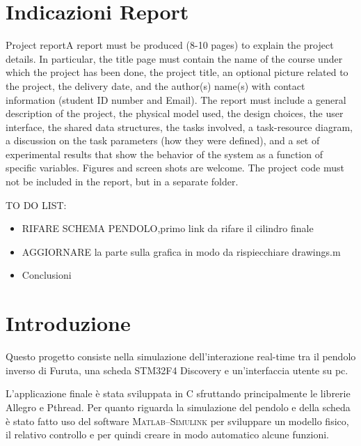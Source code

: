
\graphicspath{{./figs/}}

\title{}
\author{Francesco Petracci e Simone Silenzi} 






\section{Indicazioni Report}
Project reportA  report  must  be  produced  (8-10  pages)  to  explain  the  project  details.  In  particular,  the  title  page  must  contain  the  name  of  the  course  under  which  the  project  has  been  done,  the  project  title,  an  optional  picture related  to  the  project,  the  delivery  date,  and the  author(s)  name(s)  with  contact  information (student ID number and Email). The  report  must  include  a  general  description  of  the  project,  the  physical  model  used,  the  design  choices, the user interface, the shared data structures, the tasks involved, a task-resource diagram, a discussion  on  the  task  parameters  (how they  were  defined),  and  a  set  of  experimental  results  that show  the  behavior  of  the  system  as  a  function  of  specific  variables.  Figures  and  screen  shots  are  welcome. The project code must not be included in the report, but in a separate folder.

TO DO LIST:
\begin{itemize}
	\item RIFARE SCHEMA PENDOLO,primo link da rifare il cilindro finale
	\item AGGIORNARE la parte sulla grafica in modo da rispiecchiare drawings.m
	\item Conclusioni
\end{itemize}
 
\section{Introduzione}
Questo progetto consiste nella simulazione dell'interazione real-time tra il pendolo inverso di Furuta, una scheda STM32F4 Discovery e un'interfaccia utente su pc. 

L'applicazione finale \`e stata sviluppata in C sfruttando principalmente le librerie Allegro e Pthread. Per quanto riguarda la simulazione del pendolo e della scheda \`e stato fatto uso del software \textsc{Matlab--Simulink} per sviluppare un modello fisico, il relativo controllo e per quindi creare in modo automatico alcune funzioni.

